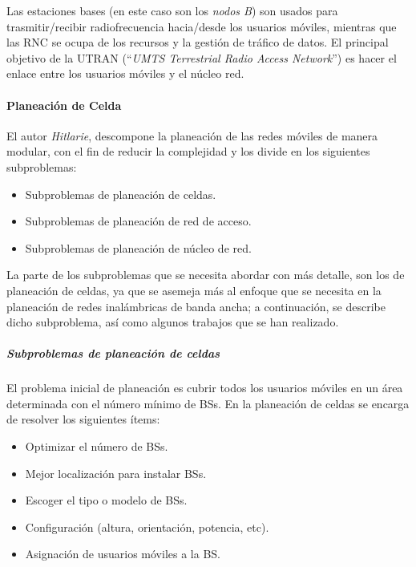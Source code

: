 \documentclass[]{article}
\let\oldparagraph\paragraph
\renewcommand{\paragraph}[1]{\oldparagraph{#1}\mbox{}}
\let\oldsubparagraph\subparagraph
\renewcommand{\subparagraph}[1]{\oldsubparagraph{#1}\mbox{}}
\begin{document}
Las estaciones bases (en este caso son los \emph{nodos B}) son usados
para trasmitir/recibir radiofrecuencia hacia/desde los usuarios móviles,
mientras que las RNC se ocupa de los recursos y la gestión de tráfico de
datos. El principal objetivo de la UTRAN (``\emph{UMTS Terrestrial Radio
Access Network}'') es hacer el enlace entre los usuarios móviles y el
núcleo red.

\paragraph{Planeación de Celda}\label{planeaciuxf3n-de-celda}

El autor \emph{Hitlarie}, descompone la planeación de las redes móviles
de manera modular, con el fin de reducir la complejidad y los divide en
los siguientes subproblemas:

\begin{itemize}
\item
  Subproblemas de planeación de celdas.
\item
  Subproblemas de planeación de red de acceso.
\item
  Subproblemas de planeación de núcleo de red.
\end{itemize}

La parte de los subproblemas que se necesita abordar con más detalle,
son los de planeación de celdas, ya que se asemeja más al enfoque que se
necesita en la planeación de redes inalámbricas de banda ancha; a
continuación, se describe dicho subproblema, así como algunos trabajos
que se han realizado.

\subparagraph{Subproblemas de planeación de
celdas}\label{subproblemas-de-planeaciuxf3n-de-celdas}

El problema inicial de planeación es cubrir todos los usuarios móviles
en un área determinada con el número mínimo de BSs. En la planeación de
celdas se encarga de resolver los siguientes ítems:

\begin{itemize}
\item
  Optimizar el número de BSs.
\item
  Mejor localización para instalar BSs.
\item
  Escoger el tipo o modelo de BSs.
\item
  Configuración (altura, orientación, potencia, etc).
\item
  Asignación de usuarios móviles a la BS.
\end{itemize}
\end{document}
